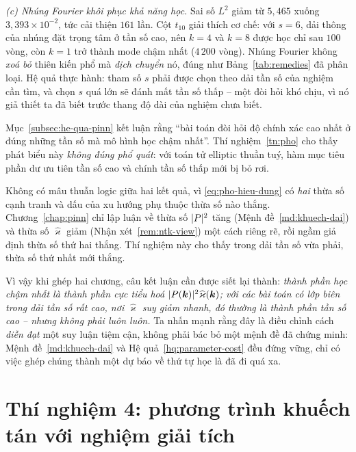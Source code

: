 \emph{(c) Nhúng Fourier khôi phục khả năng học.} Sai số $L^2$ giảm từ $5{,}465$
xuống $3{,}393\times10^{-2}$, tức cải thiện $161$ lần. Cột $t_{10}$ giải thích cơ
chế: với $s = 6$, dải thông của nhúng đặt trọng tâm ở tần số cao, nên $k = 4$ và
$k = 8$ được học chỉ sau $100$ vòng, còn $k = 1$ trở thành mode chậm nhất
($4\,200$ vòng). Nhúng Fourier không \emph{xoá bỏ} thiên kiến phổ mà \emph{dịch
chuyển} nó, đúng như Bảng~\ref{tab:remedies} đã phân loại. Hệ quả thực hành: tham
số $s$ phải được chọn theo dải tần số của nghiệm cần tìm, và chọn $s$ quá lớn sẽ
đánh mất tần số thấp -- một đòi hỏi khó chịu, vì nó giả thiết ta đã biết trước
thang độ dài của nghiệm chưa biết.
 
\begin{nhanxet}
\label{nx:hieu-chinh}
Mục~\ref{subsec:he-qua-pinn} kết luận rằng ``bài toán đòi hỏi độ chính xác cao
nhất ở đúng những tần số mà mô hình học chậm nhất''.
Thí nghiệm~\ref{tn:pho} cho thấy phát biểu này \emph{không đúng phổ quát}: với
toán tử elliptic thuần tuý, hàm mục tiêu phần dư ưu tiên tần số cao và chính tần
số thấp mới bị bỏ rơi.
 
Không có mâu thuẫn logic giữa hai kết quả, vì \eqref{eq:pho-hieu-dung} có
\emph{hai} thừa số cạnh tranh và dấu của xu hướng phụ thuộc thừa số nào thắng.
Chương~\ref{chap:pinn} chỉ lập luận về thừa số $\lvert P\rvert^2$ tăng
(Mệnh đề~\ref{md:khuech-dai}) và thừa số $\widehat{\varkappa}$ giảm
(Nhận xét~\ref{rem:ntk-view}) một cách riêng rẽ, rồi ngầm giả định thừa số thứ hai
thắng. Thí nghiệm này cho thấy trong dải tần số vừa phải, thừa số thứ nhất mới
thắng.
 
Vì vậy khi ghép hai chương, câu kết luận cần được siết lại thành: \emph{thành phần học chậm nhất là thành phần cực tiểu hoá $\lvert P(\bm{k})\rvert^{2} \widehat{\varkappa}(\bm{k})$; với các bài toán có lớp biên trong dải tần số rất cao, nơi $\widehat{\varkappa}$ suy giảm nhanh, đó thường là thành phần tần số cao -- nhưng không phải luôn luôn.} Ta nhấn mạnh rằng đây là điều chỉnh cách \emph{diễn đạt} một suy luận tiệm cận, không phải bác bỏ một mệnh đề đã chứng minh: Mệnh đề~\ref{md:khuech-dai} và Hệ quả~\ref{hq:parameter-cost} đều đứng vững, chỉ có việc ghép chúng thành một dự báo về thứ tự học là đã đi quá xa.
\end{nhanxet}
 
\section{Thí nghiệm 4: phương trình khuếch tán với nghiệm giải tích}
\label{sec:tn4}

